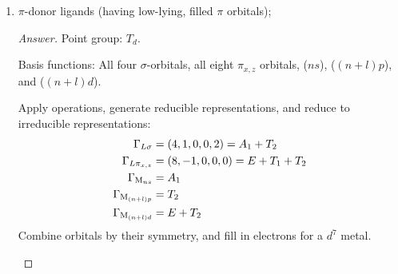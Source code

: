 \documentclass[../psets.tex]{subfiles}
\begin{document}
\begin{enumerate}[label={\Roman*)}]
\begin{enumerate}
\begin{proof}[Answer]
\begin{center}
            \end{center}
        \end{proof}
        \pagebreak
        \item $\pi$-donor ligands (having low-lying, filled $\pi$ orbitals);
        \begin{proof}[Answer]
            Point group: $T_d$.\par
            Basis functions: All four  $\sigma$-orbitals, all eight  $\pi_{x,z}$ orbitals, ($ns$), ($(n+l)p$), and ($(n+l)d$).\par
            Apply operations, generate reducible representations, and reduce to irreducible representations:
            \begin{align*}
                \Gamma_{L\sigma} &= (4,1,0,0,2) = A_1+T_2\\
                \Gamma_{L\pi_{x,z}} &= (8,-1,0,0,0) = E+T_1+T_2\\
                \Gamma_{\ce{M}_{ns}} &= A_1\\
                \Gamma_{\ce{M}_{(n+l)p}} &= T_2\\
                \Gamma_{\ce{M}_{(n+l)d}} &= E+T_2
            \end{align*}
            Combine orbitals by their symmetry, and fill in electrons for a $d^7$ metal.
            \begin{center}
\end{center}
\end{proof}
\end{enumerate}
\end{enumerate}
\end{document}

